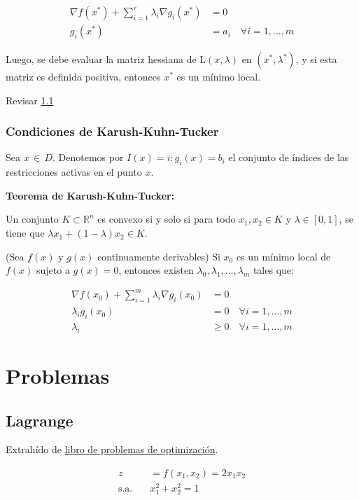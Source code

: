 \documentclass{article}
\newenvironment{question}
{\begin{mdframed}[backgroundcolor=white]}
{\end{mdframed}}
\begin{document}
\begin{align*}
    \nabla f(x^*) + \sum_{i=1}^r \lambda_i \nabla g_i(x^*) &= 0 \\
    g_i(x^*) &= a_i \quad \forall i = 1, \ldots, m
\end{align*}

Luego, se debe evaluar la matriz hessiana de $\mathrm{L}(x, \lambda)$ en $(x^*, \lambda^*)$, y si esta matriz es definida positiva, entonces $x^*$ es un mínimo local.

Revisar \ref{problemas:lagrangiano}

\subsubsection{Condiciones de Karush-Kuhn-Tucker}

Sea $x \, \in \, D$. Denotemos por $I(x)={i:g_i(x)=b_i}$ el conjunto de índices de las restricciones activas en el punto $x$.

\textbf{Teorema de Karush-Kuhn-Tucker:}

Un conjunto $K \subset \mathbb{R}^n$ es convexo si y solo si para todo $x_1, x_2 \in K$ y $\lambda \in [0, 1]$, se tiene que $\lambda x_1 + (1 - \lambda) x_2 \in K$.

(Sea $f(x)$ y $g(x)$ continuamente derivables) Si $x_0$ es un mínimo local de $f(x)$ sujeto a $g(x) = 0$, entonces existen $\lambda_0, \lambda_1, \ldots, \lambda_m$ tales que:

\begin{align*}
    \nabla f(x_0) + \sum_{i=1}^{m} \lambda_i \nabla g_i(x_0) &= 0 \\
    \lambda_i g_i(x_0) &= 0 \quad \forall i = 1, \ldots, m \\
    \lambda_i &\geq 0 \quad \forall i = 1, \ldots, m
\end{align*}


\section{Problemas}

\subsection{Lagrange} \label{problemas:lagrangiano}

\begin{question}
    Extrahído de \href{https://www.bbau.ac.in/dept/UIET/EME-601%20Operation%20Research.pdf}{libro de problemas de optimización}.

    \begin{align*}
        z \quad&=f(x_1,x_2)=2x_1x_2\\
        \text{s.a.} \quad& x_1^2+x_2^2=1
    \end{align*}
\end{question}
\end{document}

